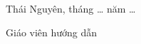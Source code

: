 \documentclass[../main.tex]{subfiles}
\begin{document}
\noindent\makebox[\textwidth]{\dotfill}

\vspace{0.35cm}
\noindent\makebox[\textwidth]{\dotfill}

\vspace{0.35cm}
\noindent\makebox[\textwidth]{\dotfill}

\vspace{0.35cm}
\noindent\makebox[\textwidth]{\dotfill}

\vspace{0.35cm}
\noindent\makebox[\textwidth]{\dotfill}

\vspace{0.35cm}
\noindent\makebox[\textwidth]{\dotfill}

\vspace{0.35cm}
\noindent\makebox[\textwidth]{\dotfill}

\vspace{0.35cm}
\noindent\makebox[\textwidth]{\dotfill}

\vspace{0.35cm}
\noindent\makebox[\textwidth]{\dotfill}

\vspace{0.35cm}
\noindent\makebox[\textwidth]{\dotfill}

\vspace{0.35cm}
\noindent\makebox[\textwidth]{\dotfill}

\vspace{0.35cm}
\noindent\makebox[\textwidth]{\dotfill}

\vspace{1.2cm}

\begin{flushright}
Thái Nguyên, tháng \ldots{} năm \ldots

Giáo viên hướng dẫn

\vspace{3cm}
\end{flushright}
\end{document}
